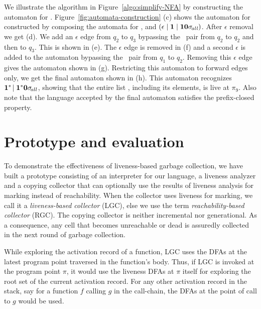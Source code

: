 

We illustrate the algorithm in Figure~\ref{algo:simplify-NFA} by
constructing the automaton for .
Figure~\ref{fig:automata-construction} (c) shows the automaton for
 constructed by composing the automata for
,  and $(\epsilon \mid \mathbf{1}
\mid \mathbf{1}\mathbf{0}\sigma_{\mathit{\!all}})$.  After $\epsilon$ removal we
get (d). We add an $\epsilon$ edge from $q_2$ to $q_3$ bypassing the
\bcdr\acdr\ pair from $q_2$ to $q_2$ and then to $q_3$. This is shown
in (e).  The $\epsilon$ edge is removed in (f) and a second $\epsilon$
is added to the automaton bypassing the \bcar\acar\ pair from $q_1$ to
$q_2$.  Removing this $\epsilon$ edge gives the automaton shown in
(g).  Restricting this automaton to forward edges only, we get the
final automaton shown in (h). This automaton recognizes $\mathbf{1}^{*}\!\mid\mathbf{1}^{*}\mathbf{0} \sigma_{\mathit \!all}$, showing that the entire
list \py, including its elements, is live at $\pi_9$. Also note that
the language accepted by the final automaton satisfies the
prefix-closed property.


\section{Prototype and evaluation}\label{sec:experiments}
To demonstrate the effectiveness of liveness-based garbage collection,
we  have  built a  prototype  consisting  of  an interpreter  for  our
language,  a  liveness  analyzer  and  a copying  collector  that  can
optionally use the results of liveness analysis for marking instead of
reachability. When the collector uses liveness for marking, we call it
a  {\em liveness-based  collector} (LGC),  else we  use the  term {\em
  reachability-based  collector}  (RGC).   The  copying  collector  is
neither incremental nor generational.  As a consequence, any cell that
becomes unreachable or  dead is assuredly collected in  the next round
of garbage collection.

While exploring the activation record of a function, LGC uses the DFAs
at  the latest  program  point traversed  in the function's body.  Thus, if  LGC
is invoked  at the program point   $\pi$,  it would  use  the
liveness  DFAs at  $\pi$ itself for exploring the root set of the
current activation record. For any other activation record in the
stack, say for a function ${\mathit f}$ calling ${\mathit g}$ in the call-chain,
the DFAs at the point of call to  ${\mathit g}$ would be used.

